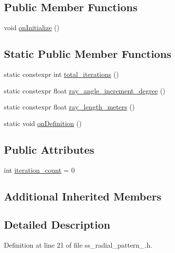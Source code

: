 \subsection*{Public Member Functions}
\begin{DoxyCompactItemize}
\item 
void \hyperlink{structsm__dance__bot_1_1SS1_1_1SsRadialPattern1_a360cb42e4b33cb70e162f8685c996344}{on\+Initialize} ()
\end{DoxyCompactItemize}
\subsection*{Static Public Member Functions}
\begin{DoxyCompactItemize}
\item 
static constexpr int \hyperlink{structsm__dance__bot_1_1SS1_1_1SsRadialPattern1_a676b62029d1fb0f6a6b5c9587de53eaa}{total\+\_\+iterations} ()
\item 
static constexpr float \hyperlink{structsm__dance__bot_1_1SS1_1_1SsRadialPattern1_a32a973bd088878e6c2b43b49bda2e2c9}{ray\+\_\+angle\+\_\+increment\+\_\+degree} ()
\item 
static constexpr float \hyperlink{structsm__dance__bot_1_1SS1_1_1SsRadialPattern1_ae04f0d0feb2d7d4b0dba0c81f69f32db}{ray\+\_\+length\+\_\+meters} ()
\item 
static void \hyperlink{structsm__dance__bot_1_1SS1_1_1SsRadialPattern1_a4ac019d02458855ca7ecc05ab553fae3}{on\+Definition} ()
\end{DoxyCompactItemize}
\subsection*{Public Attributes}
\begin{DoxyCompactItemize}
\item 
int \hyperlink{structsm__dance__bot_1_1SS1_1_1SsRadialPattern1_a148a819e2406f494f14afae15e1497b5}{iteration\+\_\+count} = 0
\end{DoxyCompactItemize}
\subsection*{Additional Inherited Members}


\subsection{Detailed Description}


Definition at line 21 of file ss\+\_\+radial\+\_\+pattern\+\_.\+h.



